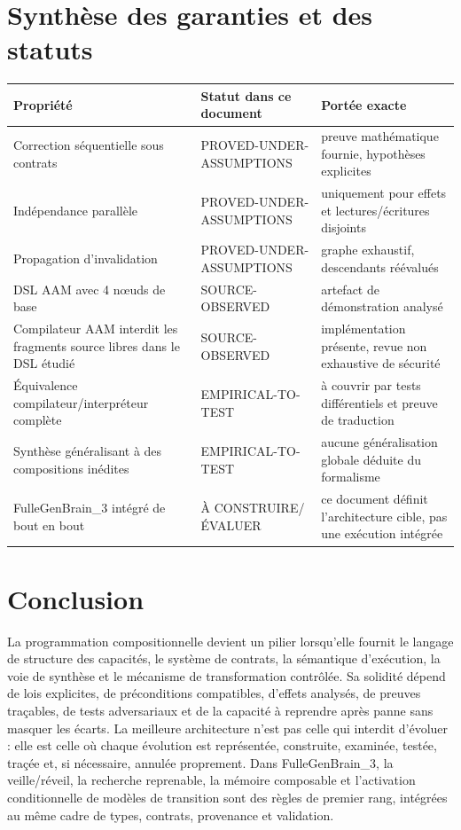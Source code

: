 \documentclass[11pt,a4paper]{article}
\theoremstyle{definition}
\theoremstyle{plain}
\theoremstyle{remark}
\begin{document}
\section{Synthèse des garanties et des statuts}
\begin{longtable}{p{}p{}p{}}
\toprule Propriété & Statut dans ce document & Portée exacte \\
\midrule
Correction séquentielle sous contrats & PROVED-UNDER-ASSUMPTIONS & preuve mathématique fournie, hypothèses explicites \\
Indépendance parallèle & PROVED-UNDER-ASSUMPTIONS & uniquement pour effets et lectures/écritures disjoints \\
Propagation d'invalidation & PROVED-UNDER-ASSUMPTIONS & graphe exhaustif, descendants réévalués \\
DSL AAM avec 4 nœuds de base & SOURCE-OBSERVED & artefact de démonstration analysé \\
Compilateur AAM interdit les fragments source libres dans le DSL étudié & SOURCE-OBSERVED & implémentation présente, revue non exhaustive de sécurité \\
Équivalence compilateur/interpréteur complète & EMPIRICAL-TO-TEST & à couvrir par tests différentiels et preuve de traduction \\
Synthèse généralisant à des compositions inédites & EMPIRICAL-TO-TEST & aucune généralisation globale déduite du formalisme \\
FulleGenBrain\_3 intégré de bout en bout & À CONSTRUIRE/ÉVALUER & ce document définit l'architecture cible, pas une exécution intégrée \\
\bottomrule
\end{longtable}

\section{Conclusion}
La programmation compositionnelle devient un pilier lorsqu'elle fournit le langage de structure des capacités, le système de contrats, la sémantique d'exécution, la voie de synthèse et le mécanisme de transformation contrôlée. Sa solidité dépend de lois explicites, de préconditions compatibles, d'effets analysés, de preuves traçables, de tests adversariaux et de la capacité à reprendre après panne sans masquer les écarts. La meilleure architecture n'est pas celle qui interdit d'évoluer : elle est celle où chaque évolution est représentée, construite, examinée, testée, traçée et, si nécessaire, annulée proprement. Dans FulleGenBrain\_3, la veille/réveil, la recherche reprenable, la mémoire composable et l'activation conditionnelle de modèles de transition sont des règles de premier rang, intégrées au même cadre de types, contrats, provenance et validation.
\end{document}
